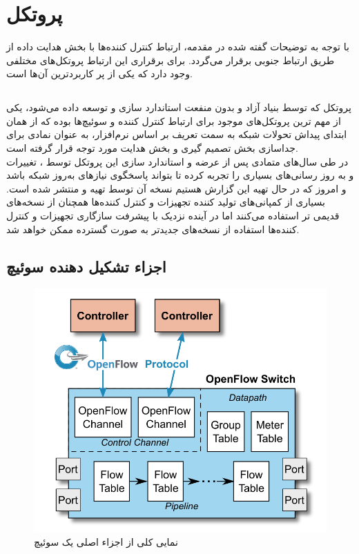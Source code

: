 \chapter{پروتکل }
با توجه به توضیحات گفته شده در مقدمه، ارتباط کنترل کننده‌ها با بخش هدایت داده از طریق ارتباط جنوبی برقرار می‌گردد. برای برقراری این ارتباط پروتکل‌های مختلفی وجود دارد که  یکی از پر کاربردترین آن‌ها است.

\section{}
پروتکل  که توسط بنیاد آزاد و بدون منفعت  استاندارد سازی و توسعه داده می‌شود، یکی از مهم ترین پروتکل‌های موجود برای ارتباط کنترل کننده و سوئیچ‌ها بوده که از همان ابتدای پیداش تحولات شبکه به سمت تعریف بر اساس نرم‌افزار، به عنوان نمادی برای جداسازی بخش تصمیم گیری و بخش هدایت مورد توجه قرار گرفته است.\\
در طی سال‌های متمادی پس از عرضه و استاندارد سازی این پروتکل توسط ، تغییرات و به روز رسانی‌های بسیاری را تجربه کرده تا بتواند پاسخگوی نیاز‌های به‌روز شبکه باشد و امروز که در حال تهیه این گزارش هستیم نسخه  آن توسط  تهیه و منتشر شده است. بسیاری از کمپانی‌های تولید کننده تجهیزات  و کنترل کننده‌ها همچنان از نسخه‌های قدیمی تر استفاده می‌کنند اما در آینده نزدیک با پیشرفت سازگاری تجهیزات و کنترل کننده‌ها استفاده از نسخه‌های جدیدتر به صورت گسترده ممکن خواهد شد.

\section{اجزاء تشکیل دهنده سوئیچ }

\begin{figure}
	\centering
	\includegraphics[scale=0.4]{imgs/of_comp.png}
	\caption{نمایی کلی از اجزاء اصلی یک سوئیچ }
	\label{fig4}
\end{figure}

